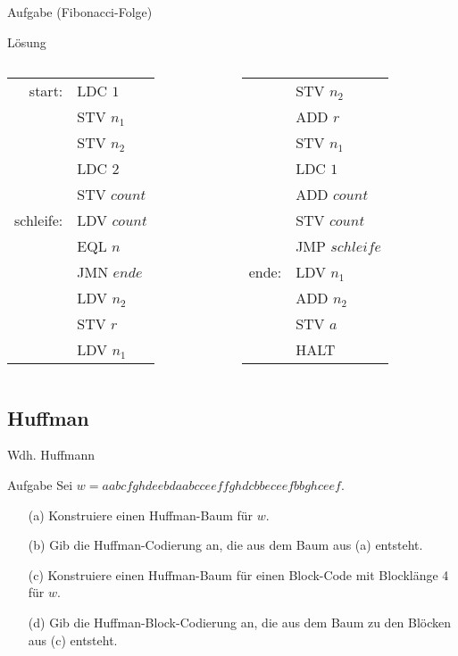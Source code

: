 \begin{frame}{Aufgabe (Fibonacci-Folge)}
	\begin{block}{Lösung}

	\begin{columns}
		\begin{column}{0.4\textwidth}
		\begin{tabular}{rl}
			start: & LDC $1$\\
			& STV $n_1$\\
			& STV $n_2$\\
			& LDC $2$\\
			& STV $count$\\
			schleife: & LDV $count$\\
			& EQL $n$\\
			& JMN $ende$\\
			& LDV $n_2$\\
			& STV $r$\\
			& LDV $n_1$\\			
		\end{tabular}
		\end{column}

		\begin{column}{0.4\textwidth}
		\begin{tabular}{rl}
			& STV $n_2$\\
			& ADD $r$\\
			& STV $n_1$\\
			& LDC $1$\\
			& ADD $count$\\
			& STV $count$\\
			& JMP $schleife$\\
			ende: & LDV $n_1$\\
			& ADD $n_2$\\
			& STV $a$\\
			& HALT			
		\end{tabular}
		\end{column}
	\end{columns}	
	\end{block}
\end{frame}

\subsection{Huffman}
\begin{frame}{Wdh. Huffmann}
	\begin{exampleblock}{Aufgabe}
		Sei $w = aabc fghd eebd aabc ceef fghd cbbe ceef bbgh ceef$.\\
		\begin{enumerate}
			\item[(a)] Konstruiere einen Huffman-Baum für $w$.
			\item[(b)] Gib die Huffman-Codierung an, die aus dem Baum aus (a) entsteht.
			\item[(c)] Konstruiere einen Huffman-Baum für einen Block-Code mit Blocklänge 4 für $w$.
			\item[(d)] Gib die Huffman-Block-Codierung an, die aus dem Baum zu den Blöcken aus (c) entsteht.
		\end{enumerate}
	\end{exampleblock}
\end{frame}


